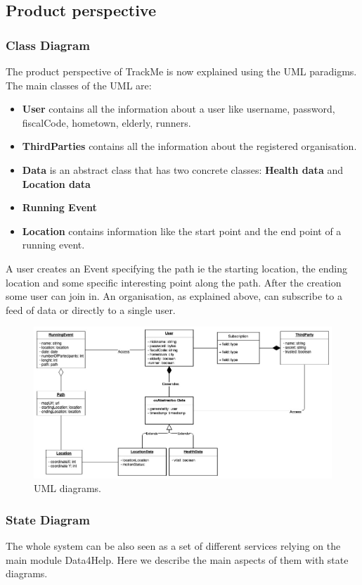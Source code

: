 \documentclass{article}
\begin{document}
\subsection{Product perspective}
\subsubsection{Class Diagram}
The product perspective of TrackMe is now explained using the UML paradigms.
The main classes of the UML are:
\begin{itemize}
	\item \textbf{User} contains all the information about a user like username, password, fiscalCode, hometown, elderly, runners.
	\item \textbf{ThirdParties} contains all the information about the registered organisation.
	\item \textbf{Data} is an abstract class that has two concrete classes: 
		\textbf{Health data} and	 \textbf{Location data}
	\item \textbf{Running Event} 
	\item \textbf{Location} contains information like the start point and the end point of a running event.
\end{itemize}

A user creates an Event specifying the path ie the starting location, the ending location and some specific interesting point along the path.
After the creation some user can join in.
An organisation, as explained above, can subscribe to a feed of data or directly to a single user.


\begin{figure}[h!]
  \includegraphics[width=\textwidth]{Figures/ClassDiagram.jpg}
  \caption{UML diagrams.}
  \label{fig:umlDiagrams}
\end{figure}
\newpage

\subsubsection{State Diagram}
The whole system can be also seen as a set of different services relying on the main module Data4Help.
Here we describe the main aspects of them with state diagrams.
\end{document}
